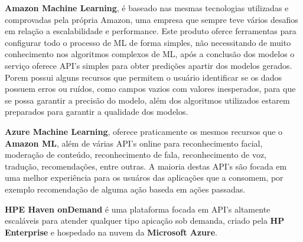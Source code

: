 \begin{alineas}
	\item \textbf{Amazon Machine Learning}, é baseado nas mesmas tecnologias utilizadas e comprovadas pela própria Amazon, uma empresa que sempre teve vários
	desafios em relação a escalabilidade e performance. Este produto oferce ferramentas para configurar todo o processo de ML de forma simples, não necessitando 
	de muito conhecimento nos algoritmos complexos de ML, após a conclusão dos modelos o serviço oferece API's simples para obter predições apartir dos modelos gerados.
	Porem possui alguns recursos que permitem o usuário identificar se os dados possuem erros ou ruídos, como campos vazios com valores inesperados, para que se possa 
	garantir a precisão do modelo, além dos algoritmos utilizados estarem preparados para garantir a qualidade dos modelos.       
	
	\item \textbf{Azure Machine Learning}, oferece praticamente os mesmos recursos que o \textbf{Amazon ML}, 
	além de várias API's online para reconhecimento	facial, moderação de conteúdo, reconhecimento de fala, reconhecimento de voz, tradução, recomendações, entre outras. 
	A maioria destas API's são focada em uma melhor experiência para os usuáros das aplicações que a consomem, por exemplo  recomendação de alguma ação baseda em 
	ações passadas.

	\item \textbf{HPE Haven onDemand} é uma plataforma focada em API's altamente escaláveis para atender qualquer tipo apicação sob demanda,
	 criado pela \textbf{HP Enterprise} e hospedado na nuvem da \textbf{Microsoft Azure}.    	
\end{alineas}







